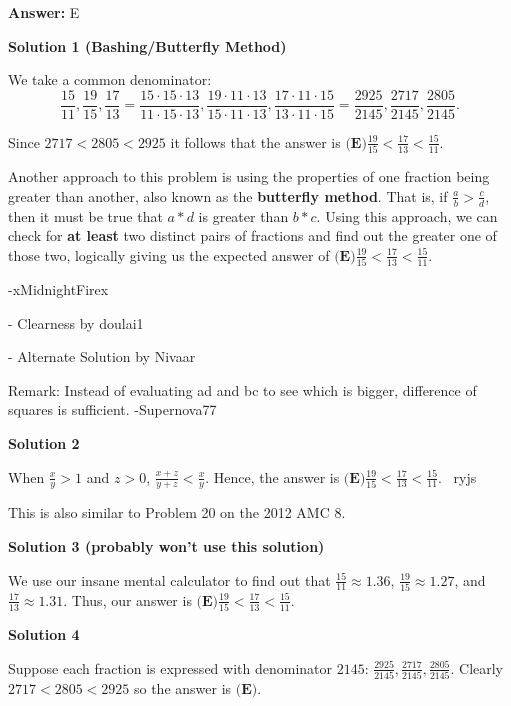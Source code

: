 \begin{enumerate}
 \textbf{Answer: }E



\textbf{Solution 1 (Bashing/Butterfly Method)}

We take a common denominator:
 \[\frac{15}{11},\frac{19}{15}, \frac{17}{13} = \frac{15\cdot 15 \cdot 13}{11\cdot 15 \cdot 13},\frac{19 \cdot 11 \cdot 13}{15\cdot 11 \cdot 13}, \frac{17 \cdot 11 \cdot 15}{13\cdot 11 \cdot 15} = \frac{2925}{2145},\frac{2717}{2145},\frac{2805}{2145}.\]

 Since $2717<2805<2925$ it follows that the answer is $\boxed{\textbf{(E)}\frac{19}{15}<\frac{17}{13}<\frac{15}{11}}$.

 Another approach to this problem is using the properties of one fraction being greater than another, also known as the \textbf{butterfly method}. That is, if $\frac{a}{b}>\frac{c}{d}$, then it must be true that $a * d$ is greater than $b * c$. Using this approach, we can check for \textbf{at least} two distinct pairs of fractions and find out the greater one of those two, logically giving us the expected answer of $\boxed{\textbf{(E)}\frac{19}{15}<\frac{17}{13}<\frac{15}{11}}$.

 -xMidnightFirex

 - Clearness by doulai1

 - Alternate Solution by Nivaar

 Remark: Instead of evaluating ad and bc to see which is bigger, difference of squares is sufficient. -Supernova77

 



\textbf{Solution 2}

When $\frac{x}{y}>1$ and $z>0$, $\frac{x+z}{y+z}<\frac{x}{y}$. Hence, the answer is $\boxed{\textbf{(E)}\frac{19}{15}<\frac{17}{13}<\frac{15}{11}}$.~ ryjs

 This is also similar to Problem 20 on the 2012 AMC 8.

 



\textbf{Solution 3 (probably won't use this solution)}

We use our insane mental calculator to find out that $\frac{15}{11} \approx 1.36$, $\frac{19}{15} \approx 1.27$, and $\frac{17}{13} \approx 1.31$. Thus, our answer is $\boxed{\textbf{(E)}\frac{19}{15}<\frac{17}{13}<\frac{15}{11}}$.

 



\textbf{Solution 4}

Suppose each fraction is expressed with denominator $2145$: $\frac{2925}{2145}, \frac{2717}{2145}, \frac{2805}{2145}$. Clearly $2717<2805<2925$ so the answer is $\boxed{\textbf{(E)}}$.


\end{enumerate}
